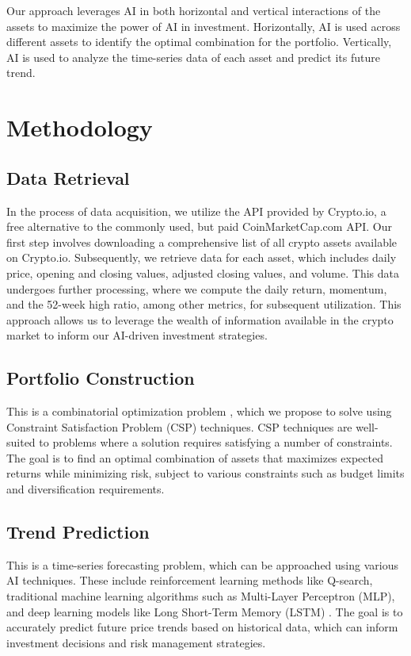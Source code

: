 \documentclass[journal]{IEEEtran}
\begin{document}
Our approach leverages AI in both horizontal and vertical interactions of the assets to maximize the power of AI in investment. Horizontally, AI is used across different assets to identify the optimal combination for the portfolio. Vertically, AI is used to analyze the time-series data of each asset and predict its future trend.

\section{Methodology}
\subsection{Data Retrieval}
In the process of data acquisition, we utilize the API provided by Crypto.io, a free alternative to the commonly used, but paid CoinMarketCap.com API. Our first step involves downloading a comprehensive list of all crypto assets available on Crypto.io. Subsequently, we retrieve data for each asset, which includes daily price, opening and closing values, adjusted closing values, and volume. This data undergoes further processing, where we compute the daily return, momentum, and the 52-week high ratio, among other metrics, for subsequent utilization. This approach allows us to leverage the wealth of information available in the crypto market to inform our AI-driven investment strategies.

\subsection{Portfolio Construction}
This is a combinatorial optimization problem \cite{lim2022dynamic, bartram2020artificial, chan2002artificial, gunjan2023brief}, which we propose to solve using Constraint Satisfaction Problem (CSP) techniques. CSP techniques are well-suited to problems where a solution requires satisfying a number of constraints. The goal is to find an optimal combination of assets that maximizes expected returns while minimizing risk, subject to various constraints such as budget limits and diversification requirements.

\subsection{Trend Prediction}
This is a time-series forecasting problem, which can be approached using various AI techniques. These include reinforcement learning methods like Q-search, traditional machine learning algorithms such as Multi-Layer Perceptron (MLP), and deep learning models like Long Short-Term Memory (LSTM) \cite{10007138, 10356083, oshingbesan2022modelfree, zhang2022deep, chen2023deep, hansun2022multivariate, gupta2024forecasting}. The goal is to accurately predict future price trends based on historical data, which can inform investment decisions and risk management strategies.
\end{document}
